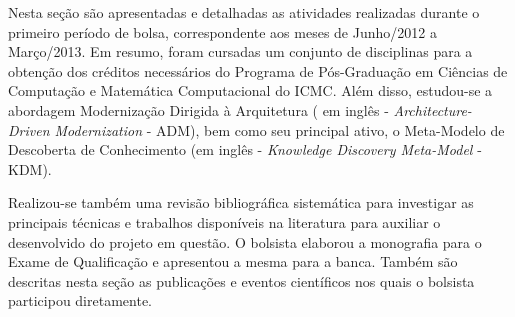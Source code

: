Nesta seção são apresentadas e detalhadas as atividades realizadas durante o primeiro período de bolsa,  
 correspondente aos meses de Junho/2012 a Março/2013.
 Em resumo, foram cursadas um conjunto de disciplinas para a obtenção dos créditos necessários do Programa de Pós-Graduação em Ciências de Computação e Matemática Computacional do ICMC. Além disso, estudou-se a abordagem Modernização Dirigida à Arquitetura
  ( em inglês - \textit{Architecture-Driven Modernization} - ADM), bem como seu principal ativo, o Meta-Modelo de Descoberta de Conhecimento (em inglês - \textit{Knowledge Discovery Meta-Model} - KDM). 

Realizou-se também uma revisão bibliográfica sistemática para investigar as principais técnicas e trabalhos disponíveis na literatura para auxiliar o desenvolvido do projeto em questão. O bolsista elaborou a monografia para o Exame de Qualificação e apresentou a mesma para a banca. Também são descritas nesta seção as publicações e eventos científicos nos quais o bolsista participou diretamente.